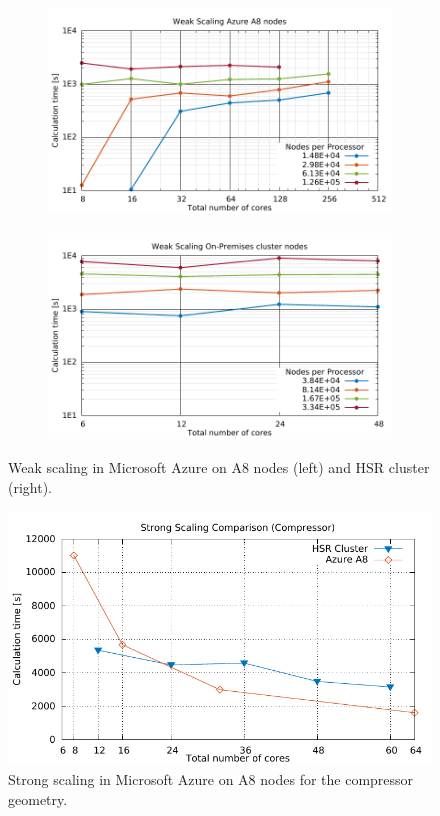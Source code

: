 \documentclass[3p,times]{elsarticle}
\begin{document}
\begin{figure}
\centering
\begin{subfigure}{.4\textwidth}
	\centering
	\includegraphics[width=\linewidth]{gplt-a8-weak-pipe}	
\end{subfigure}
\begin{subfigure}{.4\textwidth}
	\centering
	\includegraphics[width=\linewidth]{gplt-hsr-weak-pipe}
\end{subfigure}

\caption{Weak scaling in Microsoft Azure on A8 nodes (left) and HSR cluster (right). }
\label{fig:weakPipe}
\end{figure}

\begin{figure}
	\centering
	\includegraphics[width=0.5\linewidth]{gplt-compressor}
	\caption{Strong scaling in Microsoft Azure on A8 nodes for the compressor geometry. }
	\label{fig:stringCompressor}
\end{figure}
\end{document}
